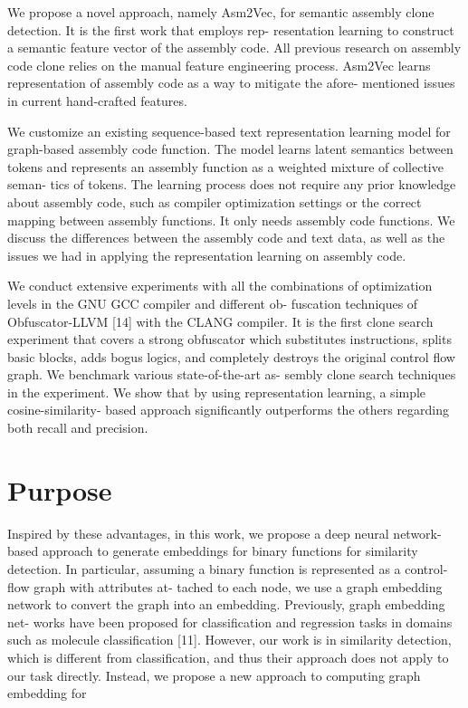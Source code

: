We propose a novel approach, namely Asm2Vec, for semantic
assembly clone detection. It is the first work that employs rep-
resentation learning to construct a semantic feature vector of
the assembly code. All previous research on assembly code clone
relies on the manual feature engineering process. Asm2Vec learns
representation of assembly code as a way to mitigate the afore-
mentioned issues in current hand-crafted features.

We customize an existing sequence-based text representation
learning model for graph-based assembly code function. The
model learns latent semantics between tokens and represents
an assembly function as a weighted mixture of collective seman-
tics of tokens. The learning process does not require any prior
knowledge about assembly code, such as compiler optimization
settings or the correct mapping between assembly functions. It
only needs assembly code functions. We discuss the differences
between the assembly code and text data, as well as the issues we
had in applying the representation learning on assembly code.

We conduct extensive experiments with all the combinations of
optimization levels in the GNU GCC compiler and different ob-
fuscation techniques of Obfuscator-LLVM [14] with the CLANG
compiler. It is the first clone search experiment that covers a
strong obfuscator which substitutes instructions, splits basic
blocks, adds bogus logics, and completely destroys the original
control flow graph. We benchmark various state-of-the-art as-
sembly clone search techniques in the experiment. We show
that by using representation learning, a simple cosine-similarity-
based approach significantly outperforms the others regarding
both recall and precision.


\section{Purpose}
Inspired by these advantages, in this work, we propose a deep
neural network-based approach to generate embeddings for binary
functions for similarity detection. In particular, assuming a binary
function is represented as a control-flow graph with attributes at-
tached to each node, we use a graph embedding network to convert
the graph into an embedding. Previously, graph embedding net-
works have been proposed for classification and regression tasks in
domains such as molecule classification [11]. However, our work is
in similarity detection, which is different from classification, and
thus their approach does not apply to our task directly. Instead,
we propose a new approach to computing graph embedding for

